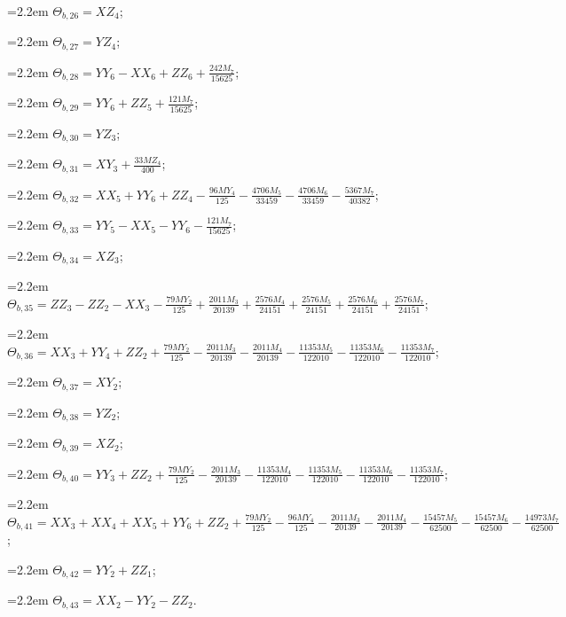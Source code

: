 {\hangindent=2.2em $\Theta_{b,26}=XZ_{4}$;\par
\hangindent=2.2em $\Theta_{b,27}=YZ_{4}$;\par
\hangindent=2.2em $\Theta_{b,28}=YY_{6}-XX_{6}+ZZ_{6}+\tfrac{242M_{7}}{15625}$;\par
\hangindent=2.2em $\Theta_{b,29}=YY_{6}+ZZ_{5}+\tfrac{121M_{7}}{15625}$;\par
\hangindent=2.2em $\Theta_{b,30}=YZ_{3}$;\par
\hangindent=2.2em $\Theta_{b,31}=XY_{3}+\tfrac{33MZ_{4}}{400}$;\par
\hangindent=2.2em $\Theta_{b,32}=XX_{5}+YY_{6}+ZZ_{4}-\tfrac{96MY_{4}}{125}-\tfrac{4706M_{5}}{33459}-\tfrac{4706M_{6}}{33459}-\tfrac{5367M_{7}}{40382}$;\par
\hangindent=2.2em $\Theta_{b,33}=YY_{5}-XX_{5}-YY_{6}-\tfrac{121M_{7}}{15625}$;\par
\hangindent=2.2em $\Theta_{b,34}=XZ_{3}$;\par
\hangindent=2.2em $\Theta_{b,35}=ZZ_{3}-ZZ_{2}-XX_{3}-\tfrac{79MY_{2}}{125}+\tfrac{2011M_{3}}{20139}+\tfrac{2576M_{4}}{24151}+\tfrac{2576M_{5}}{24151}+\tfrac{2576M_{6}}{24151}+\tfrac{2576M_{7}}{24151}$;\par
\hangindent=2.2em $\Theta_{b,36}=XX_{3}+YY_{4}+ZZ_{2}+\tfrac{79MY_{2}}{125}-\tfrac{2011M_{3}}{20139}-\tfrac{2011M_{4}}{20139}-\tfrac{11353M_{5}}{122010}-\tfrac{11353M_{6}}{122010}-\tfrac{11353M_{7}}{122010}$;\par
\hangindent=2.2em $\Theta_{b,37}=XY_{2}$;\par
\hangindent=2.2em $\Theta_{b,38}=YZ_{2}$;\par
\hangindent=2.2em $\Theta_{b,39}=XZ_{2}$;\par
\hangindent=2.2em $\Theta_{b,40}=YY_{3}+ZZ_{2}+\tfrac{79MY_{2}}{125}-\tfrac{2011M_{3}}{20139}-\tfrac{11353M_{4}}{122010}-\tfrac{11353M_{5}}{122010}-\tfrac{11353M_{6}}{122010}-\tfrac{11353M_{7}}{122010}$;\par
\hangindent=2.2em $\Theta_{b,41}=XX_{3}+XX_{4}+XX_{5}+YY_{6}+ZZ_{2}+\tfrac{79MY_{2}}{125}-\tfrac{96MY_{4}}{125}-\tfrac{2011M_{3}}{20139}-\tfrac{2011M_{4}}{20139}-\tfrac{15457M_{5}}{62500}-\tfrac{15457M_{6}}{62500}-\tfrac{14973M_{7}}{62500}$;\par
\hangindent=2.2em $\Theta_{b,42}=YY_{2}+ZZ_{1}$;\par
\hangindent=2.2em $\Theta_{b,43}=XX_{2}-YY_{2}-ZZ_{2}$.\par
}
